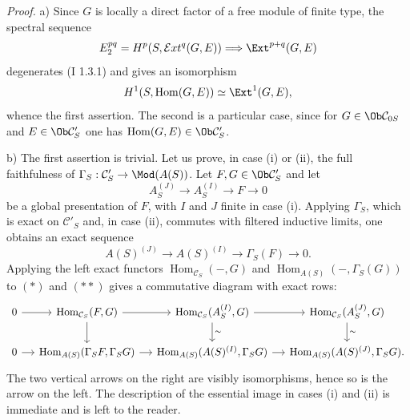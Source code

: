 \documentclass[11pt]{article}
\begin{document}
\emph{Proof.} a) Since $G$ is locally a direct factor of a free module of finite type, the spectral sequence
\[
E_2^{pq}=H^p(S,\mathcal{E}xt^q(G,E))\Longrightarrow \Ext^{p+q}(G,E)
\]
degenerates (I 1.3.1) and gives an isomorphism
\[
H^1(S,\operatorname{Hom}(G,E))\simeq \Ext^1(G,E),
\]
whence the first assertion. The second is a particular case, since for $G\in\Ob\mathcal C_{0S}$ and $E\in\Ob\mathcal C'_S$ one has $\operatorname{Hom}(G,E)\in\Ob\mathcal C'_S$.

b) The first assertion is trivial. Let us prove, in case (i) or (ii), the full faithfulness of $\Gamma_S:\mathcal C'_S\to\Mod(A(S))$. Let $F,G\in\Ob\mathcal C'_S$ and let
\[
A_S^{(J)}\longrightarrow A_S^{(I)}\longrightarrow F\longrightarrow0
\tag{$*$}
\]
be a global presentation of $F$, with $I$ and $J$ finite in case (i). Applying $\Gamma_S$, which is exact on $\mathcal C'_S$ and, in case (ii), commutes with filtered inductive limits, one obtains an exact sequence
\[
A(S)^{(J)}\longrightarrow A(S)^{(I)}\longrightarrow\Gamma_S(F)\longrightarrow0.
\tag{$**$}
\]
Applying the left exact functors $\operatorname{Hom}_{\mathcal C_S}(-,G)$ and $\operatorname{Hom}_{A(S)}(-,\Gamma_S(G))$ to $(*)$ and $(**)$ gives a commutative diagram with exact rows:
\[
\begin{tikzcd}[column sep=small]
0 \arrow[r] & \operatorname{Hom}_{\mathcal C_S}(F,G) \arrow[r] \arrow[d] &
\operatorname{Hom}_{\mathcal C_S}(A_S^{(I)},G) \arrow[r] \arrow[d,"\sim"] &
\operatorname{Hom}_{\mathcal C_S}(A_S^{(J)},G) \arrow[d,"\sim"] \\
0 \arrow[r] & \operatorname{Hom}_{A(S)}(\Gamma_SF,\Gamma_SG) \arrow[r] &
\operatorname{Hom}_{A(S)}(A(S)^{(I)},\Gamma_SG) \arrow[r] &
\operatorname{Hom}_{A(S)}(A(S)^{(J)},\Gamma_SG).
\end{tikzcd}
\]
The two vertical arrows on the right are visibly isomorphisms, hence so is the arrow on the left. The description of the essential image in cases (i) and (ii) is immediate and is left to the reader.
\end{document}
